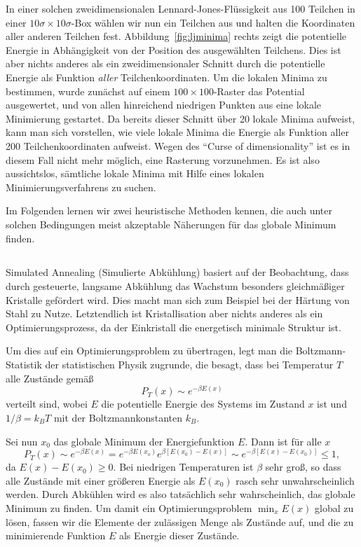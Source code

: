 In einer solchen zweidimensionalen Lennard-Jones-Flüssigkeit aus 100
Teilchen in einer $10\sigma\times 10\sigma$-Box wählen wir nun ein
Teilchen aus und halten die Koordinaten aller anderen Teilchen
fest. Abbildung~\ref{fig:ljminima} rechts zeigt die potentielle
Energie in Abhängigkeit von der Position des ausgewählten
Teilchens. Dies ist aber nichts anderes als ein zweidimensionaler
Schnitt durch die potentielle Energie als Funktion \emph{aller}
Teilchenkoordinaten. Um die lokalen Minima zu bestimmen, wurde
zunächst auf einem $100\times 100$-Raster das Potential ausgewertet,
und von allen hinreichend niedrigen Punkten aus eine lokale
Minimierung gestartet. Da bereits dieser Schnitt über 20 lokale Minima
aufweist, kann man sich vorstellen, wie viele lokale Minima die
Energie als Funktion aller 200 Teilchenkoordinaten aufweist.  Wegen
des ``Curse of dimensionality'' ist es in diesem Fall nicht mehr möglich,
eine Rasterung vorzunehmen. Es ist also aussichtslos, sämtliche lokale
Minima mit Hilfe eines lokalen Minimierungsverfahrens zu suchen.

Im Folgenden lernen wir zwei heuristische Methoden kennen, die auch
unter solchen Bedingungen meist akzeptable Näherungen für das globale
Minimum finden.

\subsection{}

Simulated Annealing (Simulierte Abkühlung) basiert auf der
Beobachtung, dass durch gesteuerte, langsame Abkühlung das Wachstum
besonders gleichmäßiger Kristalle gefördert wird. Dies macht man sich
zum Beispiel bei der Härtung von Stahl zu Nutze. Letztendlich ist
Kristallisation aber nichts anderes als ein Optimierungsprozess, da
der Einkristall die energetisch minimale Struktur ist.

Um dies auf ein Optimierungsproblem zu übertragen, legt man die
Boltzmann-Statistik der statistischen Physik zugrunde, die besagt,
dass bei Temperatur $T$ alle Zustände gemäß
\begin{equation}
  P_T(x)\sim e^{-\beta E(x)}
\end{equation}
verteilt sind, wobei $E$ die potentielle Energie des Systems im
Zustand $x$ ist und $1/\beta=k_BT$ mit der Boltzmannkonstanten $k_B$.

Sei nun $x_0$ das globale Minimum der Energiefunktion $E$. Dann ist
für alle $x$
\begin{equation}
  P_T(x)\sim e^{-\beta E(x)} = e^{-\beta E(x_o)}e^{\beta [E(x_0) - E(x)]}
  \sim e^{-\beta [E(x) - E(x_0)]} \le 1,
\end{equation}
da $E(x) - E(x_0)\ge 0$. Bei niedrigen Temperaturen ist $\beta$ sehr
groß, so dass alle Zustände mit einer größeren Energie als $E(x_0)$
rasch sehr unwahrscheinlich werden. Durch Abkühlen wird es also
tatsächlich sehr wahrscheinlich, das globale Minimum zu finden. Um
damit ein Optimierungsproblem $\min_{x} E(x)$ global zu lösen, fassen
wir die Elemente der zulässigen Menge als Zustände auf, und die zu
minimierende Funktion $E$ als Energie dieser Zustände.

